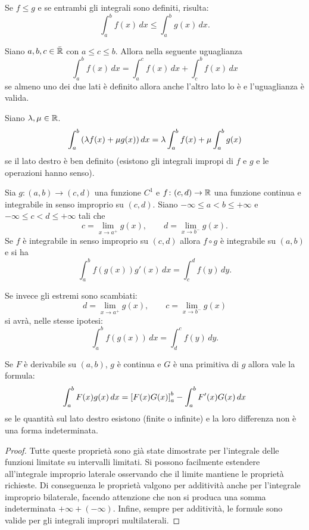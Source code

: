 \begin{theorem}
\label{th:proprieta_integrale_improprio}
Se $f\le g$ e se entrambi gli integrali sono definiti, risulta:
%
%
\[
  \int_a^b f(x)\, dx \le \int_a^b g(x)\, dx.
\]

Siano $a,b,c \in \bar {{\mathbb R}}$ con $a\le c \le b$.
Allora nella seguente uguaglianza
%
%
\[
  \int_a^b f(x)\, dx = \int_a^c f(x)\, dx + \int_c^b f(x)\, dx
\]
se almeno uno dei due lati è definito allora anche l'altro lato lo è e
l'uguaglianza è valida.

Siano $\lambda, \mu \in {\mathbb R}$.
%
%
\[
  \int_a^b {\left( \lambda f(x) + \mu g(x) \right)}\, dx
  = \lambda \int_a^b f(x) + \mu \int_a^b g(x)
\]
se il lato destro è ben definito (esistono gli integrali impropi di $f$ e $g$
e le operazioni hanno senso).

Sia $g\colon (a,b)\to (c,d)$ una funzione $C^1$
e $f\colon (c,d) \to {\mathbb R}$ una funzione continua
e integrabile in senso improprio su $(c,d)$.
Siano $-\infty \le a < b \le +\infty$ e
$-\infty \le c < d \le +\infty$ tali che
\[
c = \lim_{x\to a^+} g(x),
\qquad
d = \lim_{x\to b^-} g(x).
\]
Se $f$ è integrabile in senso improprio su $(c,d)$
allora $f \circ g$ è integrabile su $(a,b)$ e
si ha
%
%
\[
\int_a^b f(g(x)) g'(x)\, dx = \int_c^d f(y)\, dy.
\]

Se invece gli estremi sono scambiati:
\[
d = \lim_{x\to a^+} g(x),
\qquad
c = \lim_{x\to b^-} g(x)
\]
si avrà, nelle stesse ipotesi:
\[
  \int_a^b f(g(x))\, dx = \int_d^c f(y)\, dy.
\]

Se $F$ è derivabile su $(a,b)$, $g$ è continua 
e $G$ è una primitiva di $g$ allora vale la formula:
%
%
\[
 \int_a^b F(x)g(x)\, dx = {\left[ F(x) G(x) \right]}_a^b - \int_a^b F'(x)G(x)\, dx  
\]
se le quantità sul lato destro esistono (finite o infinite) e la loro 
differenza non è una forma indeterminata.
\end{theorem}
%
\begin{proof}
Tutte queste proprietà sono già state dimostrate per l'integrale delle funzioni
limitate su intervalli limitati. Si possono facilmente estendere all'integrale
improprio laterale osservando che il limite mantiene le proprietà richieste.
Di conseguenza le proprietà valgono per additività anche per l'integrale
improprio bilaterale, facendo attenzione che non si produca una somma
indeterminata $+\infty + (-\infty)$.
Infine, sempre per additività, le formule sono valide per gli integrali
impropri multilaterali.
\end{proof}

